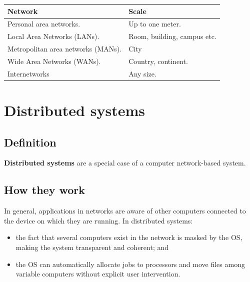 \documentclass[a4paper]{systems-software}
\begin{document}
\begin{longtabu} to \textwidth {| X[1,l] | X[1,l] |}
	\hline
	\textbf{Network} & \textbf{Scale}
	\\ \hline
	Personal area networks. & Up to one meter.
	\\ \hline
	Local Area Networks (LANs). & Room, building, campus etc.
	\\ \hline
	Metropolitan area networks (MANs). & City
	\\ \hline
	Wide Area Networks (WANs). & Country, continent.
	\\ \hline
	Internetworks & Any size.
	\\ \hline
\end{longtabu}


\section*{Distributed systems}

\subsection*{Definition}

\textbf{Distributed systems} are a special case of a computer network-based system.


\subsection*{How they work}

In general, applications in networks are aware of other computers connected to the device on which they are running. In distributed systems:
\begin{itemize}
	\item the fact that several computers exist in the network is masked by the OS, making the system transparent and coherent; and
	\item the OS can automatically allocate jobs to processors and move files among variable computers without explicit user intervention.
\end{itemize}
\end{document}
